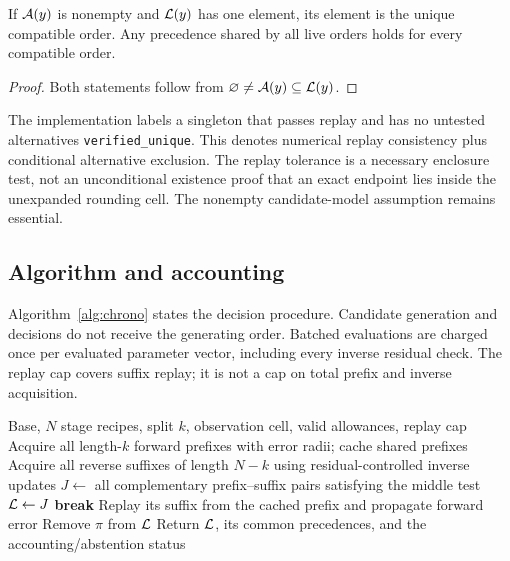 \begin{proposition}
If $\mathcal{A}(y)$ is nonempty and $\mathcal{L}(y)$ has one element, its element is the unique compatible order. Any precedence shared by all live orders holds for every compatible order.
\end{proposition}
\begin{proof}
Both statements follow from $\varnothing\ne\mathcal{A}(y)\subseteq\mathcal{L}(y)$.
\end{proof}
The implementation labels a singleton that passes replay and has no untested alternatives \texttt{verified\_unique}. This denotes numerical replay consistency plus conditional alternative exclusion. The replay tolerance is a necessary enclosure test, not an unconditional existence proof that an exact endpoint lies inside the unexpanded rounding cell. The nonempty candidate-model assumption remains essential.

\subsection{Algorithm and accounting}
Algorithm~\ref{alg:chrono} states the decision procedure. Candidate generation and decisions do not receive the generating order. Batched evaluations are charged once per evaluated parameter vector, including every inverse residual check. The replay cap covers suffix replay; it is not a cap on total prefix and inverse acquisition.

\begin{algorithm}[t]
\caption{Conditional bidirectional chronology audit}\label{alg:chrono}
\begin{algorithmic}[1]
\Require Base, $N$ stage recipes, split $k$, observation cell, valid allowances, replay cap
\State Acquire all length-$k$ forward prefixes with error radii; cache shared prefixes
\State Acquire all reverse suffixes of length $N-k$ using residual-controlled inverse updates
\State $J\gets$ all complementary prefix--suffix pairs satisfying the middle test
\State $\mathcal{L}\gets J$
    \State \textbf{break} 
  \EndIf
  \State Replay its suffix from the cached prefix and propagate forward error
    \State Remove $\pi$ from $\mathcal{L}$
  \EndIf
\EndFor
\State Return $\mathcal{L}$, its common precedences, and the accounting/abstention status
\end{algorithmic}
\end{algorithm}

